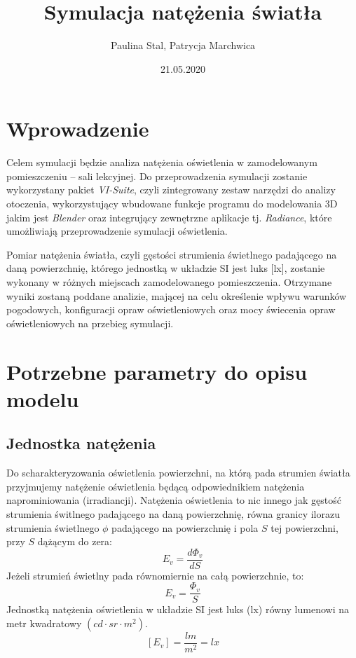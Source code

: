 \documentclass[a4paper,12pt]{article}
\title{Symulacja natężenia światła}
\author{Paulina Stal, Patrycja Marchwica}
\date{21.05.2020}
\begin{document}
	\maketitle
	
	\section{Wprowadzenie}
	\label{sec:wprowadzenie}
	
	Celem symulacji będzie analiza natężenia oświetlenia w zamodelowanym pomieszczeniu -- sali lekcyjnej. Do przeprowadzenia symulacji zostanie wykorzystany pakiet \emph{VI-Suite}, czyli zintegrowany zestaw narzędzi do analizy otoczenia, wykorzystujący wbudowane funkcje programu do modelowania 3D jakim jest \emph{Blender} oraz integrujący zewnętrzne aplikacje tj. \emph{Radiance}, które umożliwiają przeprowadzenie symulacji oświetlenia.
	
	Pomiar natężenia światła, czyli gęstości strumienia świetlnego padającego na daną powierzchnię, którego jednostką w układzie SI jest luks [lx], zostanie wykonany w różnych miejscach zamodelowanego pomieszczenia. Otrzymane wyniki zostaną poddane analizie, mającej na celu określenie wpływu warunków pogodowych, konfiguracji opraw oświetleniowych oraz mocy świecenia opraw oświetleniowych na przebieg symulacji.  
	

	\section{Potrzebne parametry do opisu modelu}
	 \label{sec:opis_modelu}

	\subsection{Jednostka natężenia}
	\label{subsec:jednostka_natezenia}

	Do scharakteryzowania oświetlenia powierzchni, na którą pada strumien światła przyjmujemy natężenie oświetlenia będącą odpowiednikiem natężenia naprominiowania (irradiancji). Natężenia oświetlenia to nic innego jak gęstość strumienia świtlnego padającego na daną powierzchnię, równa granicy ilorazu strumienia świetlnego $\phi$ padającego na powierzchnię i pola $S$ tej powierzchni, przy $S$ dążącym do zera:
	$$E_{v}=\frac{d \Phi_{v}}{d S}$$
	Jeżeli strumień świetlny pada równomiernie na całą powierzchnie, to:
	$$E_{v}=\frac{\Phi_{v}}{S}$$
Jednostką natężenia oświetlenia w układzie SI jest luks (lx) równy lumenowi na metr kwadratowy $(cd \cdot sr \cdot m^{2})$.
	$$\left[E_{v}\right]=\frac{l m}{m^{2}}=l x$$
	\newpage
\end{document}
